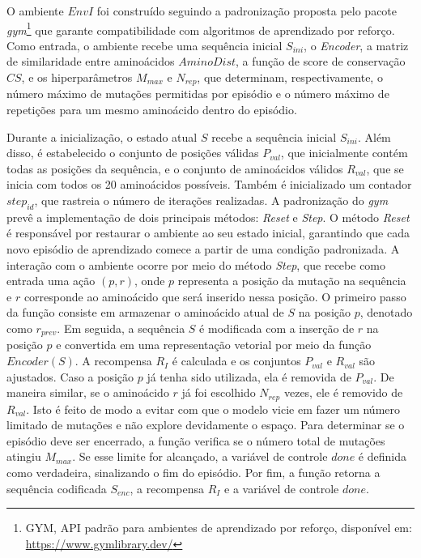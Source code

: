 O ambiente $EnvI$ foi construído seguindo a padronização proposta 
pelo pacote \textit{gym}\footnote{GYM, API padrão para ambientes de aprendizado por reforço, disponível em: \url{https://www.gymlibrary.dev/}} 
que garante compatibilidade com algoritmos de aprendizado por reforço.
Como entrada, o ambiente recebe uma sequência inicial $S_{ini}$, 
o \textit{Encoder}, a matriz de similaridade entre aminoácidos $\textit{AminoDist}$,
a função de score de conservação $CS$, 
e os hiperparâmetros $M_{max}$ e $N_{rep}$, que determinam, respectivamente,
o número máximo de mutações permitidas por episódio e o número máximo de repetições para um mesmo aminoácido dentro do episódio.

Durante a inicialização, 
o estado atual $S$ recebe a sequência inicial $S_{ini}$. 
Além disso, é estabelecido o conjunto de posições válidas $P_{val}$,
que inicialmente contém todas as posições da sequência, 
e o conjunto de aminoácidos válidos $R_{val}$, 
que se inicia com todos os 20 aminoácidos possíveis. 
Também é inicializado um contador $step_{id}$, 
que rastreia o número de iterações realizadas.
A padronização do \textit{gym} prevê a implementação de dois principais métodos: \textit{Reset} e \textit{Step}.
O método \textit{Reset} é responsável por restaurar o ambiente ao seu estado inicial,
garantindo que cada novo episódio de aprendizado comece a partir de uma condição padronizada.
A interação com o ambiente ocorre por meio do método \textit{Step},
que recebe como entrada uma ação $(p, r)$, onde $p$ representa a posição da mutação na sequência 
e $r$ corresponde ao aminoácido que será inserido nessa posição. 
O primeiro passo da função consiste em armazenar o aminoácido atual de $S$ na posição $p$, 
denotado como $r_{prev}$.
Em seguida, a sequência $S$ é modificada com a inserção de $r$ na posição $p$ 
e convertida em uma representação vetorial por meio da função $Encoder(S)$.
A recompensa $R_{I}$ é calculada e os conjuntos $P_{val}$ e $R_{val}$ são ajustados. 
Caso a posição $p$ já tenha sido utilizada, ela é removida de $P_{val}$.
De maneira similar, se o aminoácido $r$ já foi escolhido $N_{rep}$ vezes, 
ele é removido de $R_{val}$. Isto é feito de modo a evitar com que o modelo vicie em 
fazer um número limitado de mutações e não explore devidamente o espaço. 
Para determinar se o episódio deve ser encerrado,
a função verifica se o número total de mutações atingiu $M_{max}$. 
Se esse limite for alcançado, a variável de controle $done$ é definida como verdadeira,
sinalizando o fim do episódio. Por fim, a função retorna a sequência codificada $S_{enc}$, a recompensa $R_{I}$ 
e a variável de controle $done$.


